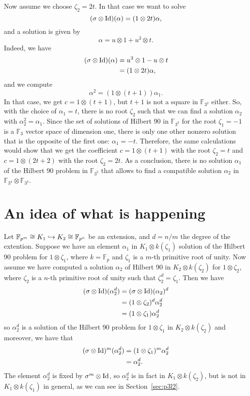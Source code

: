 \documentclass[a4paper,11pt]{article}
\begin{document}
Now assume we choose $\zeta_2=2t$. In that case we want to solve
\[
  (\sigma\otimes\operatorname{Id})(\alpha) = (1\otimes 2t)\alpha,
\]
and a solution is given by 
\[
  \alpha = u\otimes1 + u^3\otimes t.
\]
Indeed, we have
\begin{align*}
  (\sigma\otimes\operatorname{Id})(\alpha) &= u^3\otimes1-u\otimes t \\
  &= (1\otimes 2t)\alpha,
\end{align*}
and we compute
\[
  \alpha^2 = (1\otimes (t+1))\alpha_1.
\]
In that case, we get $c=1\otimes(t+1)$, but $t+1$ is not a square in
$\mathbb{F}_{3^2}$ either. So, with the choice of $\alpha_1=t$, there is no root
$\zeta_2$ such that we can find a solution $\alpha_2$ with
$\alpha_2^2=\alpha_1$. Since the set of solutions of Hilbert 90 in
$\mathbb{F}_{3^2}$ for the root $\zeta_1=-1$ is a $\mathbb{F}_3$ vector space of
dimension one, there is only one other nonzero solution that is the opposite of
the first one: $\alpha_1= -t$. Therefore, the same calculations would show that
we get the coefficient $c=1\otimes (t+1)$ with the root $\zeta_2=t$ and
$c=1\otimes(2t+2)$ with the root $\zeta_2=2t$. As a conclusion, there is no
solution $\alpha_1$ of the Hilbert 90 problem in $\mathbb{F}_{3^2}$ that allows to
find a compatible solution $\alpha_2$ in
$\mathbb{F}_{3^4}\otimes\mathbb{F}_{3^2}$.

\section{An idea of what is happening}
Let $\mathbb{F}_{p^m}\cong K_1\hookrightarrow K_2\cong \mathbb{F}_{p^n}$ be an extension,
and $d=n/m$ the degree of the extention. Suppose we have an element $\alpha_1$ in $K_1\otimes k(\zeta_1)$ solution of
the Hilbert 90 problem for $1\otimes\zeta_1$, where
$k=\mathbb{F}_p$ and $\zeta_1$ is a $m$-th primitive root of unity. Now assume
we have computed a solution $\alpha_2$ of Hilbert 90 in $K_2\otimes k(\zeta_2)$ for
$1\otimes\zeta_2$, where $\zeta_2$ is a $n$-th primitive root of unity such that
$\zeta_2^d=\zeta_1$. Then we have 
\begin{align*}
  (\sigma\otimes\operatorname{Id})(\alpha_2^d) &= (\sigma\otimes\operatorname{Id})(\alpha_2)^d \\
  &= (1\otimes\zeta_2)^d\alpha_2^d \\
  &= (1\otimes\zeta_1)\alpha_2^d
\end{align*}
so $\alpha_2^d$ is a solution of the Hilbert 90 problem for $1\otimes\zeta_1$ in
$K_2\otimes k(\zeta_2)$ and moreover, we have that
\begin{align*}
  (\sigma\otimes\operatorname{Id})^m(\alpha_2^d) &= (1\otimes\zeta_1)^m\alpha_2^d \\
  &= \alpha_2^d.
\end{align*}
The element $\alpha_2^d$ is fixed by $\sigma^m\otimes\operatorname{Id}$,
so $\alpha_2^d$ is in fact in $K_1\otimes k(\zeta_2)$, but is not in
$K_1\otimes k(\zeta_1)$ in general, as we can see in Section~\ref{sec:p3l2}.
\end{document}
